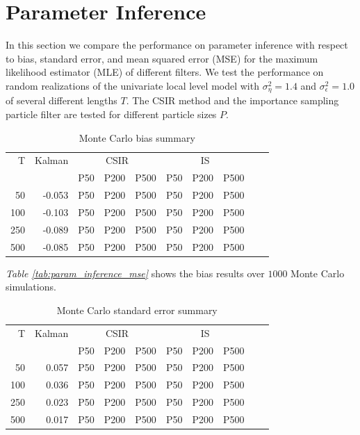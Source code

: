\documentclass[11pt, oneside]{scrreprt}   	%
\begin{document}
\section{Parameter Inference}
In this section we compare the performance on parameter inference with respect to bias, standard error, and mean squared error (MSE) for the maximum likelihood estimator (MLE) of different filters. We test the performance on random realizations of the univariate local level model with $\sigma_{\eta}^2=1.4$ and $\sigma_{\epsilon}^2=1.0$ of several different lengths $T$. The CSIR method and the importance sampling particle filter are tested for different particle sizes $P$.

\begin{table}[h!]
\centering
\begin{tabular}{rrrrrrrrrr}
\hline
T  & Kalman &  \multicolumn{3}{c}{CSIR} &  \multicolumn{3}{c}{IS}\\
\cline{3-8}
& & P50 & P200 & P500 & P50 & P200 & P500\\
\hline
50        & -0.053 & P50 & P200 & P500 & P50 & P200 & P500\\
100      & -0.103 & P50 & P200 & P500 & P50 & P200 & P500\\
250      & -0.089 & P50 & P200 & P500 & P50 & P200 & P500\\
500      & -0.085 & P50 & P200 & P500 & P50 & P200 & P500\\
\hline
\end{tabular}
\caption{Monte Carlo bias summary}
\label{tab:param_inference_bias}
\end{table}

\textit{Table \ref{tab:param_inference_mse}} shows the bias results over $1000$ Monte Carlo simulations.

\begin{table}[h!]
\centering
\begin{tabular}{rrrrrrrrrr}
\hline
T  & Kalman &  \multicolumn{3}{c}{CSIR} &  \multicolumn{3}{c}{IS}\\
\cline{3-8}
& & P50 & P200 & P500 & P50 & P200 & P500\\
\hline
50        & 0.057 & P50 & P200 & P500 & P50 & P200 & P500\\
100      & 0.036 & P50 & P200 & P500 & P50 & P200 & P500\\
250      & 0.023 & P50 & P200 & P500 & P50 & P200 & P500\\
500      & 0.017 & P50 & P200 & P500 & P50 & P200 & P500\\
\hline
\end{tabular}
\caption{Monte Carlo standard error summary}
\label{tab:param_inference_se}
\end{table}
\end{document}
